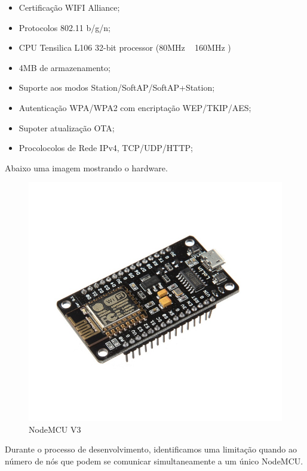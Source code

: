 \documentclass[openright]{normas-utf-tex} %
\begin{document}
\begin{itemize}
    \item Certificação WIFI Alliance;  \cite{espressif}
    \item Protocolos 802.11 b/g/n;\cite{espressif}
    \item CPU Tensilica L106 32-bit processor (80MHz ~ 160MHz )  \cite{Novatec}
    \item 4MB de armazenamento;
    \item Suporte aos modos Station/SoftAP/SoftAP+Station;\cite{espressif}
    \item Autenticação WPA/WPA2 com encriptação WEP/TKIP/AES;\cite{espressif}
    \item Supoter atualização OTA;\cite{espressif}
    \item Procolocolos de Rede IPv4, TCP/UDP/HTTP;\cite{espressif}
\end{itemize}

Abaixo uma imagem mostrando o hardware.

\begin{figure}[h!b]
\centering 
\includegraphics[scale=0.5]{nodemcu.jpg}
\caption{NodeMCU V3}
\label{NodeMCU}
\end{figure}

Durante o processo de desenvolvimento, identificamos uma limitação quando ao número de nós que podem se comunicar simultaneamente a um único NodeMCU. 
\end{document}
